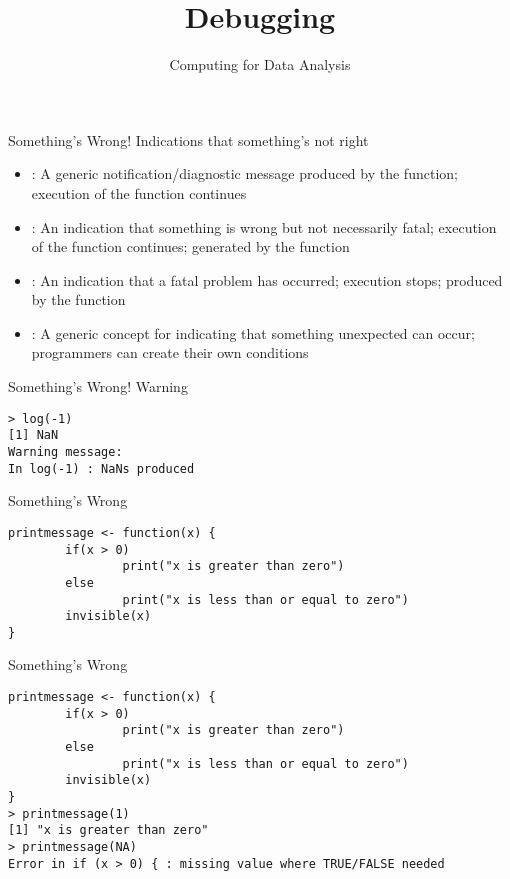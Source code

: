 \documentclass[aspectratio=169]{beamer}
\title[Debugging]{Debugging}
\date{Computing for Data Analysis}
\begin{document}
\begin{frame}
  \titlepage
\end{frame}


\begin{frame}{Something's Wrong!}
Indications that something's not right
\begin{itemize}
\item {}: A generic notification/diagnostic message
  produced by the  function; execution of the function
  continues
\item {}: An indication that something is wrong but not
  necessarily fatal; execution of the function continues; generated by
  the  function
\item {}: An indication that a fatal problem has occurred;
  execution stops; produced by the  function
\item {}: A generic concept for indicating that
  something unexpected can occur; programmers can create their own
  conditions
\end{itemize}
\end{frame}

\begin{frame}[fragile]{Something's Wrong!}
Warning
\begin{verbatim}
> log(-1)
[1] NaN
Warning message:
In log(-1) : NaNs produced
\end{verbatim}
\end{frame}

\begin{frame}[fragile]{Something's Wrong}
\begin{verbatim}
printmessage <- function(x) {
        if(x > 0)
                print("x is greater than zero")
        else 
                print("x is less than or equal to zero")
        invisible(x)
}
\end{verbatim}
\end{frame}

\begin{frame}[fragile]{Something's Wrong}
\begin{verbatim}
printmessage <- function(x) {
        if(x > 0)
                print("x is greater than zero")
        else 
                print("x is less than or equal to zero")
        invisible(x)
}
> printmessage(1)
[1] "x is greater than zero"
> printmessage(NA)
Error in if (x > 0) { : missing value where TRUE/FALSE needed
\end{verbatim}
\end{frame}
\end{document}

